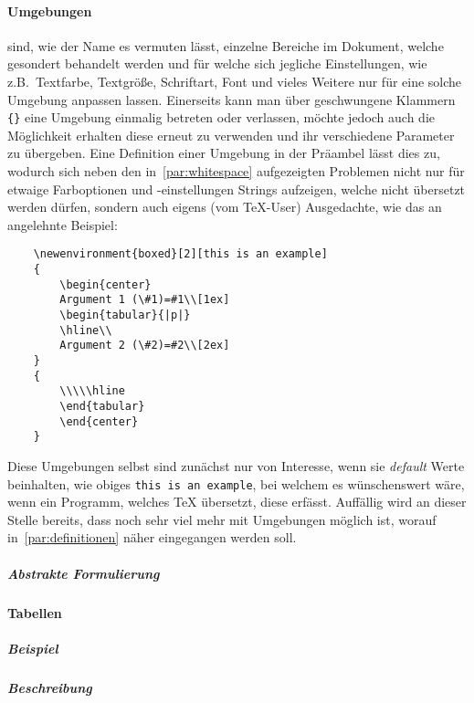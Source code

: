 \paragraph*{Umgebungen} sind, wie der Name es vermuten lässt, einzelne Bereiche im Dokument, welche gesondert behandelt werden und für welche sich jegliche Einstellungen, wie z.B.\ Textfarbe, Textgröße, Schriftart, Font und vieles Weitere nur für eine solche Umgebung anpassen lassen. Einerseits kann man über geschwungene Klammern \verb|{}| eine Umgebung einmalig betreten oder verlassen, möchte jedoch auch die Möglichkeit erhalten diese erneut zu verwenden und ihr verschiedene Parameter zu übergeben. Eine Definition einer Umgebung in der Präambel lässt dies zu, %
wodurch sich neben den in~\ref{par:whitespace} aufgezeigten Problemen nicht nur für etwaige Farboptionen und -einstellungen Strings aufzeigen, welche nicht übersetzt werden dürfen, sondern auch eigens (vom \TeX{}-User) Ausgedachte, wie das an \citep{latex:overleaf:environments} angelehnte Beispiel:
\begin{Verbatim}
    \newenvironment{boxed}[2][this is an example]
    {
        \begin{center}
        Argument 1 (\#1)=#1\\[1ex]
        \begin{tabular}{|p|}
        \hline\\
        Argument 2 (\#2)=#2\\[2ex]
    }
    { 
        \\\\\hline
        \end{tabular} 
        \end{center}
    }
\end{Verbatim}
Diese Umgebungen selbst sind zunächst nur von Interesse, wenn sie \textit{default} Werte beinhalten, wie obiges \texttt{this is an example}, bei welchem es wünschenswert wäre, wenn ein Programm, welches \TeX{} übersetzt, diese erfässt. Auffällig wird an dieser Stelle bereits, dass noch sehr viel mehr mit Umgebungen möglich ist, worauf in~\ref{par:definitionen} näher eingegangen werden soll.

\subparagraph*{Abstrakte Formulierung}




\paragraph*{Tabellen}%
\subparagraph*{Beispiel}
\subparagraph*{Beschreibung}

